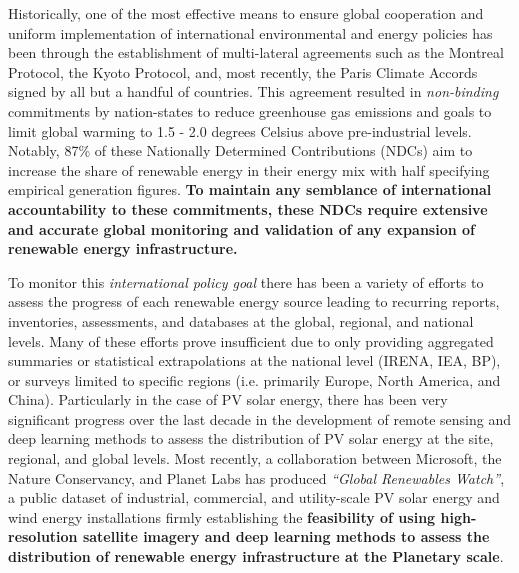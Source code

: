 Historically, one of the most effective means to ensure global cooperation and uniform implementation of international environmental and energy policies has been through the establishment of multi-lateral agreements such as the Montreal Protocol, the Kyoto Protocol, and, most recently, the Paris Climate Accords signed by all but a handful of countries. 
This agreement resulted in \textit{non-binding} commitments by nation-states to reduce greenhouse gas emissions and goals to limit global warming to 1.5 - 2.0 degrees Celsius above pre-industrial levels. 
Notably, 87\% of these Nationally Determined Contributions (NDCs) aim to increase the share of renewable energy in their energy mix with half specifying empirical generation figures\cite{robinson_ms_planet_global_renewables_watch_2025}. 
\textbf{To maintain any semblance of international accountability to these commitments, these NDCs require extensive and accurate global monitoring and validation of any expansion of renewable energy infrastructure.}

To monitor this \textit{international policy goal} there has been a variety of efforts to assess the progress of each renewable energy source leading to recurring reports, inventories, assessments, and databases at the global, 
regional, and national levels. Many of these efforts prove insufficient due to only providing aggregated summaries or statistical extrapolations at the national level (IRENA, IEA, BP), or surveys limited to specific regions 
(i.e. primarily Europe, North America, and China). Particularly in the case of PV solar energy, there has been very significant progress over the last decade in the development of remote sensing and deep learning methods to assess 
the distribution of PV solar energy at the site, regional, and global levels\cite{Yu_deep_solar_2018}\cite{Hu_solar_array_pitfalls_2022}\cite{de-Hoog_sota_survey_2020}\cite{Jiang_rooftop_pv_assessment_2022}\cite{kruitwagen_global_inventory_pv_units_2021}\cite{yang_GloSoFarID_2024}\cite{Tremenbert_Kasmi_pyPV_roof_2023}\cite{Pueblas_workflow_rooftop_PV_assessment_sat_img_2023}\cite{feng_10m_S2_China_2024}\cite{robinson_ms_planet_global_renewables_watch_2025}.  
Most recently, a collaboration between Microsoft, the Nature Conservancy, and Planet Labs\cite{robinson_ms_planet_global_renewables_watch_2025} has produced \textit{``Global Renewables Watch''}, 
a public dataset of industrial, commercial, and utility-scale PV solar energy and wind energy installations firmly establishing the \textbf{feasibility of using high-resolution satellite imagery and deep learning methods 
to assess the distribution of renewable energy infrastructure at the Planetary scale}.  \\

